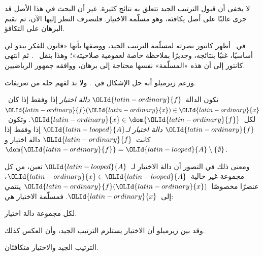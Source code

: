 \documentclass[../../../include/open-logic-section]{subfiles}
\begin{document}

لا يخفى أن قبول الترتيب الجيد تتعلق به نتائج كثيرة. غير أن البحث في
هذا الأصل قد جرى غالبًا على أصل يكافئه، وهو مسلّمة الاختيار. فلنصرف
النظر إليها الآن، ثم نقيم البرهان على التكافؤ.

في~\citeyear{Cantor1883} أظهر كانتور نصرته لمسلّمة الترتيب الجيد،
ووصفها بأنها «قانون للفكر يبدو لي أساسيًا، غنيًا بنتائجه، وجديرًا
بملاحظة خاصة لعمومية صلاحيته»؛ وهذا بنقل~\citeauthor{Potter2004}
\citeyear[p.~243]{Potter2004}. ثم انتهى كانتور إلى أن هذه «المسلّمة»
نفسها محتاجة إلى برهان، ووافقه جمهور الرياضيين.

وزعم زيرميلو أنه حل الإشكال في~\citeyear{Zermelo1904}. ولا بد لفهم
حله من تعريفات.

\begin{defn}
تكون الدالة~$\OLId{latin-ordinary}{f}$ \emph{دالة اختيار} إذا وفقط إذا كان~$\OLId{latin-ordinary}{f}(\OLId{latin-ordinary}{x}) \in \OLId{latin-ordinary}{x}$
لكل~$\OLId{latin-ordinary}{x} \in \dom{\OLId{latin-ordinary}{f}}$. وتكون~$\OLId{latin-ordinary}{f}$ \emph{دالة اختيار لـ$\OLId{latin-looped}{A}$} إذا وفقط
إذا كانت~$\OLId{latin-ordinary}{f}$ دالة اختيار و$\dom{\OLId{latin-ordinary}{f}} = \OLId{latin-looped}{A} \setminus \{\emptyset\}$.
\end{defn}

ومعنى ذلك في التصور أن دالة الاختيار لـ~$\OLId{latin-looped}{A}$ تعين، من كل مجموعة غير
خالية~$\OLId{latin-ordinary}{x} \in \OLId{latin-looped}{A}$، عنصرًا مخصوصًا~$\OLId{latin-ordinary}{f}(\OLId{latin-ordinary}{x})$ ينتمي إلى~$\OLId{latin-ordinary}{x}$. فمسلّمة
الاختيار هي:

\begin{axiom}[الاختيار]
	لكل مجموعة دالة اختيار.
\end{axiom}

وقد بين زيرميلو أن الاختيار يستلزم الترتيب الجيد، وأن العكس كذلك.

\begin{thm}[في $\ZF$]
الترتيب الجيد والاختيار متكافئان.
\end{thm}
\end{document}
